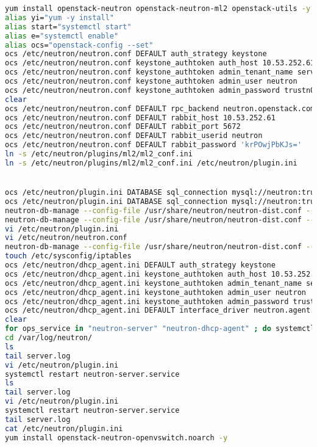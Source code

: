 \documentclass[11pt,letterpaper,oneside]{book}
\begin{document}
\begin{lstlisting}[caption={Neutron virneupaw001},language=bash]
yum install openstack-neutron openstack-neutron-ml2 openstack-utils -y
alias yi="yum -y install"
alias start="systemctl start"
alias e="systemctl enable"
alias ocs="openstack-config --set"
ocs /etc/neutron/neutron.conf DEFAULT auth_strategy keystone
ocs /etc/neutron/neutron.conf keystone_authtoken auth_host 10.53.252.61
ocs /etc/neutron/neutron.conf keystone_authtoken admin_tenant_name service
ocs /etc/neutron/neutron.conf keystone_authtoken admin_user neutron
ocs /etc/neutron/neutron.conf keystone_authtoken admin_password trustn01
clear
ocs /etc/neutron/neutron.conf DEFAULT rpc_backend neutron.openstack.common.rpc.impl_kombu
ocs /etc/neutron/neutron.conf DEFAULT rabbit_host 10.53.252.61
ocs /etc/neutron/neutron.conf DEFAULT rabbit_port 5672
ocs /etc/neutron/neutron.conf DEFAULT rabbit_userid neutron
ocs /etc/neutron/neutron.conf DEFAULT rabbit_password 'krPOwjPbKJs='
ln -s /etc/neutron/plugins/ml2/ml2_conf.ini
ln -s /etc/neutron/plugins/ml2/ml2_conf.ini /etc/neutron/plugin.ini


ocs /etc/neutron/plugin.ini DATABASE sql_connection mysql://neutron:trustn01@10.53.252.61/neutron
ocs /etc/neutron/plugin.ini DATABASE sql_connection mysql://neutron:trustn01@10.53.252.61/neutron_ml2
neutron-db-manage --config-file /usr/share/neutron/neutron-dist.conf --config-file /etc/neutron/neutron.conf --config /etc/neutron/plugin.ini upgrade head
neutron-db-manage --config-file /usr/share/neutron/neutron-dist.conf --config-file /etc/neutron/neutron.conf --config-file /etc/neutron/plugin.ini upgrade head
vi /etc/neutron/plugin.ini 
vi /etc/neutron/neutron.conf 
neutron-db-manage --config-file /usr/share/neutron/neutron-dist.conf --config-file /etc/neutron/neutron.conf --config-file /etc/neutron/plugin.ini upgrade head
touch /etc/sysconfig/iptables
ocs /etc/neutron/dhcp_agent.ini DEFAULT auth_strategy keystone
ocs /etc/neutron/dhcp_agent.ini keystone_authtoken auth_host 10.53.252.61
ocs /etc/neutron/dhcp_agent.ini keystone_authtoken admin_tenant_name service
ocs /etc/neutron/dhcp_agent.ini keystone_authtoken admin_user neutron
ocs /etc/neutron/dhcp_agent.ini keystone_authtoken admin_password trustn01
ocs /etc/neutron/dhcp_agent.ini DEFAULT interface_driver neutron.agent.linux.interface.OVSInterfaceDriver
clear
for ops_service in "neutron-server" "neutron-dhcp-agent" ; do systemctl enable $ops_service; systemctl start $ops_service; done
cd /var/log/neutron/
ls
tail server.log 
vi /etc/neutron/plugin.ini 
systemctl restart neutron-server.service 
ls
tail server.log 
vi /etc/neutron/plugin.ini 
systemctl restart neutron-server.service 
tail server.log 
cat /etc/neutron/plugin.ini 
yum install openstack-neutron-openvswitch.noarch -y
\end{lstlisting}
\end{document}
